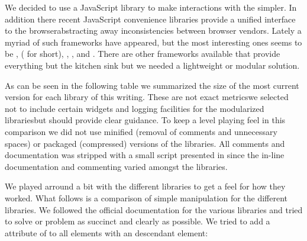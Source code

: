 We decided to use a JavaScript library to make interactions with the
 simpler.
In addition there recent JavaScript convenience libraries provide a
unified interface to the browser\dash{}abstracting away inconsistencies
between browser vendors. Lately a myriad of such frameworks have appeared,
but the most interesting ones seems to be
,
 ( for short),
,
, and
.%
There are other frameworks available that provide everything but the kitchen
sink but we needed a lightweight or modular solution.

As can be seen in the following table we summarized the size of the most
current version for each library of this writing. These are not exact
metrics\dash{}we selected not to include certain widgets and logging
facilities for the modularized libraries\dash{}but should provide clear
guidance. To keep a level playing feel in this comparison we did not use
minified (removal of comments and unnecessary spaces) or packaged (compressed)
versions of the libraries. All comments and documentation was stripped with a
small script presented in 
since the in-line documentation and commenting varied amongst the libraries.


We played arround a bit with the different libraries to get a feel for how
they worked. What follows is a comparison of simple  manipulation
for the different libraries. We followed the official documentation for the
various libraries and tried to solve or problem as succinct and clearly as
possible. We tried to add a  attribute of  to
all  elements with an descendant  element: 


